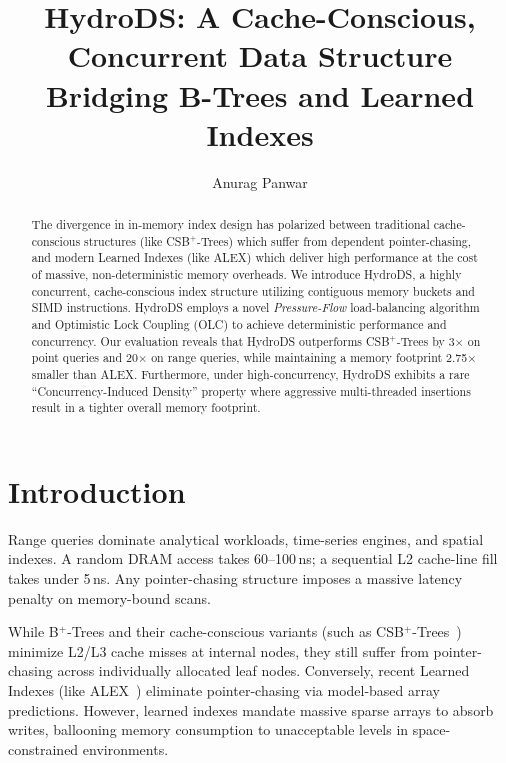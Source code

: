 \documentclass[sigconf]{acmart}
\begin{document}
\title{HydroDS: A Cache-Conscious, Concurrent Data Structure Bridging B-Trees and Learned Indexes}

\author{Anurag Panwar}

\begin{abstract}
The divergence in in-memory index design has polarized between traditional cache-conscious structures (like CSB$^+$-Trees) which suffer from dependent pointer-chasing, and modern Learned Indexes (like ALEX) which deliver high performance at the cost of massive, non-deterministic memory overheads. We introduce HydroDS, a highly concurrent, cache-conscious index structure utilizing contiguous memory buckets and SIMD instructions. HydroDS employs a novel \textit{Pressure-Flow} load-balancing algorithm and Optimistic Lock Coupling (OLC) to achieve deterministic performance and concurrency. Our evaluation reveals that HydroDS outperforms CSB$^+$-Trees by 3$\times$ on point queries and 20$\times$ on range queries, while maintaining a memory footprint 2.75$\times$ smaller than ALEX. Furthermore, under high-concurrency, HydroDS exhibits a rare ``Concurrency-Induced Density'' property where aggressive multi-threaded insertions result in a tighter overall memory footprint.
\end{abstract}


\maketitle

\section{Introduction}
Range queries dominate analytical workloads, time-series engines, and spatial indexes. A random DRAM access takes 60--100\,ns; a sequential L2 cache-line fill takes under 5\,ns. Any pointer-chasing structure imposes a massive latency penalty on memory-bound scans. 

While B$^+$-Trees and their cache-conscious variants (such as CSB$^+$-Trees~\cite{rao2000making}) minimize L2/L3 cache misses at internal nodes, they still suffer from pointer-chasing across individually allocated leaf nodes. Conversely, recent Learned Indexes (like ALEX~\cite{ding2020alex}) eliminate pointer-chasing via model-based array predictions. However, learned indexes mandate massive sparse arrays to absorb writes, ballooning memory consumption to unacceptable levels in space-constrained environments.
\end{document}
